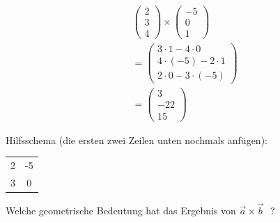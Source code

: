 \documentclass[paper=a6,ngerman,twoside=true,fontsize=14pt, parskip = half]{scrartcl}
\begin{document}
\begin{antwort}
	
	\begin{align*}
	&\left(\begin{array}{c} 2 \\ 3 \\ 4\end{array} \right) \times \left(\begin{array}{c} -5 \\ 0 \\ 1\end{array} \right) \\
	&= \left(\begin{array}{c} 3 \cdot 1 - 4 \cdot 0 \\ 4 \cdot (-5) - 2 \cdot 1 \\ 2 \cdot 0 - 3 \cdot (-5)\end{array} \right)\\
	&=\left(\begin{array}{c} 3 \\ -22 \\ 15\end{array} \right)
	\end{align*}
	
	Hilfsschema (die ersten zwei Zeilen unten nochmals anfügen):
	\begin{center}
	\begin{tabular}{cc}
	2 & -5 \\
	3 & 0
	\end{tabular}
	\end{center}
		
\end{antwort}	
\begin{frage}
	
	Welche geometrische Bedeutung hat das Ergebnis von $\vec{a}\times\vec{b}\textbf{ }$?
	
\end{frage}
\end{document}
